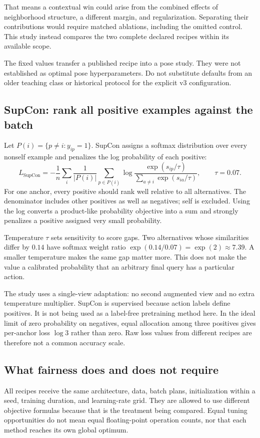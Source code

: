 That means a contextual win could arise from the combined effects of neighborhood
structure, a different margin, and regularization. Separating their contributions
would require matched ablations, including the omitted control. This study
instead compares the two complete declared recipes within its available scope.

The fixed values transfer a published recipe into a pose study. They were not
established as optimal pose hyperparameters. Do not substitute defaults from
an older teaching class or historical protocol for the explicit v3 configuration.

\subsection{SupCon: rank all positive examples against the batch}
Let $P(i)=\{p\ne i:y_{ip}=1\}$. SupCon assigns a softmax distribution over
every nonself example and penalizes the log probability of each positive:
\[
 L_{\mathrm{SupCon}}=-\frac1n\sum_i\frac1{|P(i)|}
   \sum_{p\in P(i)}\log
   \frac{\exp(s_{ip}/\tau)}{\sum_{a\ne i}\exp(s_{ia}/\tau)},
 \qquad \tau=0.07.
\]
For one anchor, every positive should rank well relative to all alternatives.
The denominator includes other positives as well as negatives; self is excluded.
Using the log converts a product-like probability objective into a sum and
strongly penalizes a positive assigned very small probability.

Temperature $\tau$ sets sensitivity to score gaps. Two alternatives whose
similarities differ by $0.14$ have softmax weight ratio
$\exp(0.14/0.07)=\exp(2)\approx7.39$. A smaller temperature makes the same
gap matter more. This does not make the value a calibrated probability that
an arbitrary final query has a particular action.

The study uses a single-view adaptation: no second augmented view and no extra
temperature multiplier. SupCon is supervised because action labels define
positives. It is not being used as a label-free pretraining method here.
In the ideal limit of zero probability on negatives, equal allocation among
three positives gives per-anchor loss $\log 3$ rather than zero. Raw loss values from different
recipes are therefore not a common accuracy scale.\cite{supcon}

\subsection{What fairness does and does not require}
All recipes receive the same architecture, data, batch plans, initialization
within a seed, training duration, and learning-rate grid. They are allowed to
use different objective formulas because that is the treatment being compared.
Equal tuning opportunities do not mean equal floating-point operation counts,
nor that each method reaches its own global optimum.

